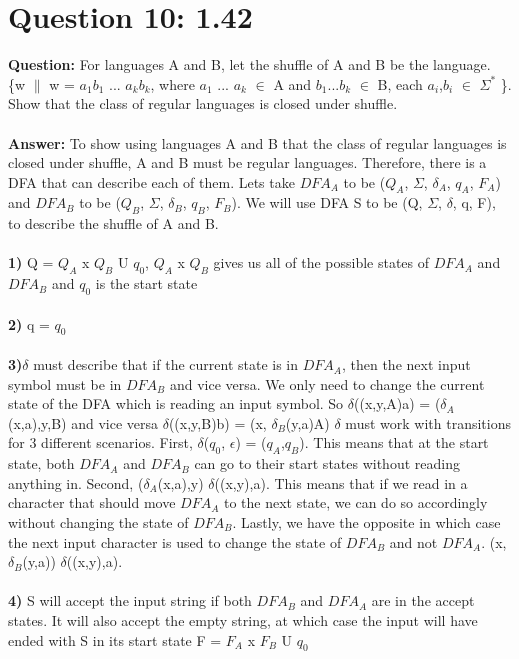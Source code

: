 \documentclass[12pt]{article}
\begin{document}
\section*{Question 10: 1.42}
{\bfseries Question:} For languages A and B, let the shuffle of A and B be the language.
\{w $\|$ w = $a_1$$b_1$ ... $a_k$$b_k$, where $a_1$ ... $a_k$  $\in$ A and $b_1$...$b_k$ $\in$ B, each $a_i$,$b_i$ $\in$  $\Sigma^{*}$ \}. Show that the class of regular languages is closed under shuffle. 
\\
\\
{\bfseries {Answer}: }
To show using languages A and B that the class of regular languages is closed under shuffle, A and B must be regular languages. Therefore, there is a DFA that can describe each of them. Lets take $DFA_A$ to be ($Q_A$, $\Sigma$, $\delta_A$, $q_A$, $F_A$) and $DFA_B$ to be ($Q_B$, $\Sigma$, $\delta_B$, $q_B$, $F_B$). We will use DFA S to be (Q, $\Sigma$, $\delta$, q, F), to describe the shuffle of A and B. 
\\
\\{\bfseries 1)} Q = $Q_A$ x $Q_B$ U {$q_0$}, $Q_A$ x $Q_B$ gives us all of the possible states of $DFA_A$ and $DFA_B$ and {$q_0$} is the start state
\\
\\{\bfseries 2)} q = $q_0$ 
\\
\\{\bfseries 3)}$\delta$ must describe that if the current state is in $DFA_A$, then the next input symbol must be in $DFA_B$ and vice versa. We only need to change the current state of the DFA which is reading an input symbol. So $\delta$((x,y,A)a) = ($\delta_A$(x,a),y,B) and vice versa $\delta$((x,y,B)b) = (x, $\delta_B$(y,a)A)
$\delta$ must work with transitions for 3 different scenarios. First, $\delta$($q_0$, $\epsilon$) = ($q_A$,$q_B$). This means that at the start state, both $DFA_A$ and $DFA_B$ can go to their start states without reading anything in. Second, ($\delta_A$(x,a),y) \in $\delta$((x,y),a). This means that if we read in a character that should move $DFA_A$ to the next state, we can do so accordingly without changing the state of $DFA_B$. Lastly, we have the opposite in which case the next input character is used to change the state of $DFA_B$ and not $DFA_A$. (x,$\delta_B$(y,a)) \in $\delta$((x,y),a).
\\
\\{\bfseries 4)} S will accept the input string if both $DFA_B$ and $DFA_A$ are in the accept states. It will also accept the empty string, at which case the input will have ended with S in its start state  F = $F_A$ x $F_B$ U {$q_0$}
\end{document}
